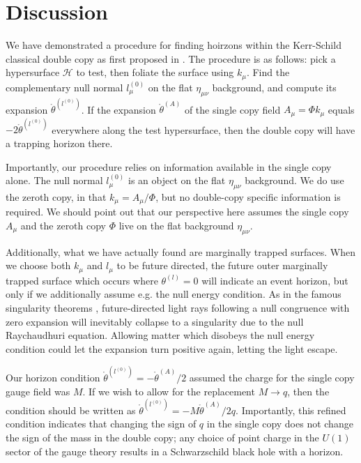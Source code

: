 \section{Discussion} \label{Horizons:sec:discussion}
We have demonstrated a procedure for finding hoirzons within the Kerr-Schild classical double copy as first proposed in \cite{Monteiro:2014cda}.
The procedure is as follows: pick a hypersurface $\mathcal{H}$ to test, then foliate the surface using $k_\mu$.  Find the complementary null normal $l^{(0)}_\mu$ on the flat $\eta_{\mu\nu}$ background, and compute its expansion $\mathring{\theta}^{(l^{(0)})}$.  If the expansion $\mathring{\theta}^{(A)}$ of the single copy field $A_\mu=\Phi k_\mu$ equals $-2\mathring{\theta}^{(l^{(0)})}$ everywhere along the test hypersurface, then the double copy will have a trapping horizon there.

Importantly, our procedure relies on information available in the single copy alone.  The null normal $l^{(0)}_\mu$ is an object on the flat $\eta_{\mu\nu}$ background.  We do use the zeroth copy, in that $k_\mu=A_\mu/\Phi$, but no double-copy specific information is required.  We should point out that our perspective here assumes the single copy $A_\mu$ and the zeroth copy $\Phi$ live on the flat background $\eta_{\mu\nu}$.

Additionally, what we have actually found are marginally trapped surfaces. When we choose both $k_\mu$ and $l_\mu$ to be future directed, the future outer marginally trapped surface which occurs where $\theta^{(l)}=0$ will indicate an event horizon, but only if we additionally assume e.g. the null energy condition. As in the famous singularity theorems \cite{Penrose:1964wq}, future-directed light rays following a null congruence with zero expansion will inevitably collapse to a singularity due to the null Raychaudhuri equation. Allowing matter which disobeys the null energy condition could let the expansion turn positive again, letting the light escape.

Our horizon condition $\mathring{\theta}^{(l^{(0)})}=-\mathring{\theta}^{(A)}/2$ assumed the charge for the single copy gauge field was $M$.  If we wish to allow for the replacement $M\rightarrow q$, then the condition should be written as $\mathring{\theta}^{(l^{(0)})}=-M\mathring{\theta}^{(A)}/2q$.  Importantly, this refined condition indicates that changing the sign of $q$ in the single copy does not change the sign of the mass in the double copy; any choice of point charge in the $U(1)$ sector of the gauge theory results in a Schwarzschild black hole with a horizon.

